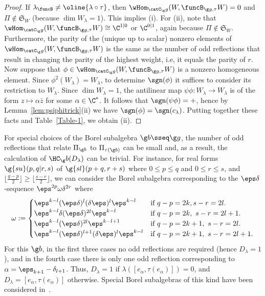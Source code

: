 \documentclass[12pt]{amsart}
\begin{document}
\begin{proof} 
If $\lambda_\funcB\neq\oline{\lambda\circ\tau}$, then $\wHom_{\catC_\g g}(W,\funcB_{\g g,\tau}W)=0$ and 
$\Pi\not\in \mathfrak S_W$ (because $\dim W_\lambda=1$). This implies
(i). For (ii), note that   
$\wHom_{\catC_\g g}(W,\funcB_{\g g,\tau}W)\cong \C^{1|0}$ or $\C^{0|1}$, again because $\Pi\not\in \mathfrak S_W$. 
Furthermore, the  parity of the (unique up to scalar) nonzero elements of 
$\wHom_{\catC_\g g}(W,\funcB_{\g g,\tau}W)$ is the same as the number of odd reflections that result in changing the parity of the highest weight, i.e, it equals the parity of $r$.
Now suppose that $\phi\in\wHom_{\catC_\g g}(W,\funcB_{\g g,\tau}W)$ is a nonzero homogeneous element. 
Since $\phi^2(W_\lambda)=W_\lambda$, to determine $\sgn(\phi)$ it suffices to consider its restriction to $W_\lambda$. 
Since $\dim W_\lambda=1$, the antilinear map $\psi \phi:W_\lambda\to W_\lambda$ is of the form $z\mapsto \alpha \bar z$ for some  $\alpha\in\C^*$. It follows that $\sgn(\psi\phi)=+$, hence by Lemma~\ref{lem:psiphitrick}(ii) we have $\sgn(\phi)=\sgn(c_\lambda)$. Putting together these facts and Table~\ref{Table-1}, we obtain (ii). 
\end{proof}
\begin{rmk}
\label{rmk:specialBor}
For special choices of the Borel subalgebra $\g b\sseq \g g$, the number of odd reflections   that relate $\Pi_{\g b}$ to $\Pi_{\tau(\g b)}$ can be small and, as a result, the calculation of  $\HC_\g b(D_\lambda)$ can be trivial. For instance, for real forms $\g{su}(p,q|r,s)$ of $\g{sl}(p+q,r+s)$ where $0\leq p\leq q$ and $0\leq r\leq s$, and $\lfloor \frac{q-p}{2}\rfloor \geq \lfloor\frac{s-r}{2}\rfloor$, we can consider the Borel subalgebra corresponding to the 
$\eps\delta$-sequence $\eps^{2p}\omega \delta^{2r}$ where
\[
\omega:=\begin{cases}
\eps^{k-l}(\eps\delta)^{l}
(\delta\eps)^{l}
\eps^{k-l} &\text{if }q-p=2k,s-r=2l.\\
\eps^{k-l}\delta(\eps\delta)^{2l}\eps^{k-l} &\text{if }q-p=2k,\ s-r=2l+1.\\
\eps^{k-l}(\eps\delta)^{2l}\eps^{k-l+1} &\text{if }q-p=2k+1,\ s-r=2l.\\
\eps^{k-l}(\eps\delta)^{l+1}(\delta\eps)^l\eps^{k-l}&\text{if }q-p=2k+1,\ s-r=2l+1.
\end{cases}
\]
For this $\g b$, in the first three cases no odd reflections are required (hence $D_\lambda=1$), and in the fourth case there is only one odd reflection corresponding to $\alpha=\eps_{k+1}-\delta_{l+1}$. Thus,  $D_\lambda=1$ if $\lambda([e_\alpha,\tau(e_\alpha)])=0$, and $D_\lambda=[e_\alpha,\tau(e_\alpha)]$ otherwise. Special Borel subalgebras of this kind have been considered in~\cite[Sec. 5]{Hayashi}.

\end{rmk}
\end{document}
